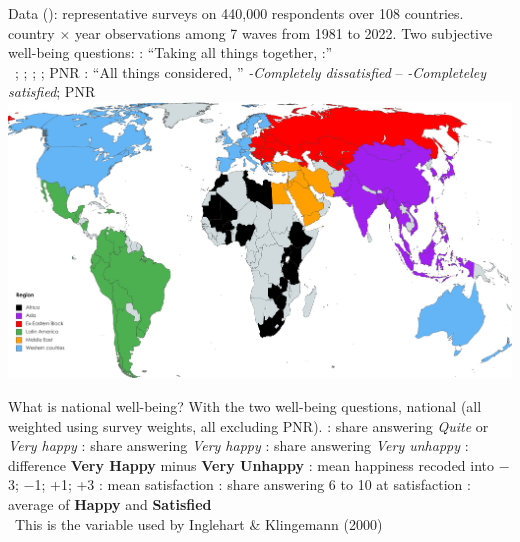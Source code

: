 \documentclass[aspectratio=169,xcolor=dvipsnames, 11pt,mathserif]{beamer}
\begin{document}
\begin{frame}{Data}
    \bbvsp
    \ip {} (): representative surveys on 440,000 respondents over 108 countries.
     country $\times$ year observations among 7 waves from 1981 to 2022.
    \ip Two subjective well-being questions:
    \bbvsp 
    \ip {}: ``Taking all things together, :'' \\ ~\textit{}; \textit{}; \textit{}; \textit{}; PNR %
    \ip {}: ``All things considered, '' \textit{-Completely dissatisfied} -- \textit{-Completeley satisfied}; PNR %
    \ee
    \ee
    \centering \includegraphics[height=.5\textheight]{../figures/WVS_countries_regions}
\end{frame}

\begin{frame}{What is national well-being?}
    With the two well-being questions,  national  (all weighted using survey weights, all excluding PNR).
    \bbvsp
    \ip \textbf{}: share answering \textit{Quite} or \textit{Very happy}
    \ip \textbf{}: share answering \textit{Very happy}
    \ip \textbf{}: share answering \textit{Very unhappy}
    \ip \textbf{}: difference \textbf{Very Happy} minus \textbf{Very Unhappy}
    \ip \textbf{}: mean happiness recoded into $-$3; $-$1; +1; +3
    \ip \textbf{}: mean satisfaction
    \ip \textbf{}: share answering 6 to 10 at satisfaction
    \ip \textbf{}: average of \textbf{Happy} and \textbf{Satisfied}\\ ~\quad This is the variable used by Inglehart \& Klingemann (2000) %
    \ee 
\end{frame}
\end{document}
